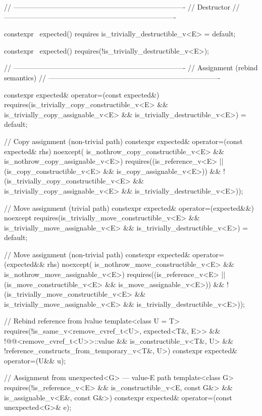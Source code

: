 \begin{codeblock}
{  // -------------------------------------------------------------------------
  // Destructor
  // -------------------------------------------------------------------------

  constexpr ~expected()
    requires is_trivially_destructible_v<E>
  = default;

  constexpr ~expected()
    requires(!is_trivially_destructible_v<E>);

  // -------------------------------------------------------------------------
  // Assignment (rebind semantics)
  // -------------------------------------------------------------------------

  constexpr expected& operator=(const expected&)
    requires(is_trivially_copy_constructible_v<E> &&
             is_trivially_copy_assignable_v<E> && is_trivially_destructible_v<E>)
  = default;

  // Copy assignment (non-trivial path)
  constexpr expected& operator=(const expected& rhs) noexcept(
      is_nothrow_copy_constructible_v<E> && is_nothrow_copy_assignable_v<E>)
    requires((is_reference_v<E> ||
              (is_copy_constructible_v<E> && is_copy_assignable_v<E>)) &&
             !(is_trivially_copy_constructible_v<E> &&
               is_trivially_copy_assignable_v<E> && is_trivially_destructible_v<E>));

  // Move assignment (trivial path)
  constexpr expected& operator=(expected&&) noexcept
    requires(is_trivially_move_constructible_v<E> &&
             is_trivially_move_assignable_v<E> && is_trivially_destructible_v<E>)
  = default;

  // Move assignment (non-trivial path)
  constexpr expected& operator=(expected&& rhs) noexcept(
      is_nothrow_move_constructible_v<E> && is_nothrow_move_assignable_v<E>)
    requires((is_reference_v<E> ||
              (is_move_constructible_v<E> && is_move_assignable_v<E>)) &&
             !(is_trivially_move_constructible_v<E> &&
               is_trivially_move_assignable_v<E> && is_trivially_destructible_v<E>));

  // Rebind reference from lvalue
  template<class U = T>
    requires(!is_same_v<remove_cvref_t<U>, expected<T&, E>> &&
             !@@<remove_cvref_t<U>>::value &&
             is_constructible_v<T&, U> && !reference_constructs_from_temporary_v<T&, U>)
  constexpr expected& operator=(U&& u);

  // Assignment from unexpected<G> — value-E path
  template<class G>
    requires(!is_reference_v<E> && is_constructible_v<E, const G&> &&
             is_assignable_v<E&, const G&>)
  constexpr expected& operator=(const unexpected<G>& e);

}
\end{codeblock}

